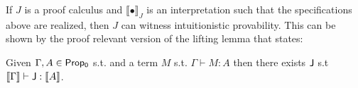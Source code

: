     If  $J$ is a proof calculus and $\llbracket\bullet \rrbracket_J$ is  an interpretation such that the specifications above  
    are realized, then $J$ can witness intuitionistic provability. This can be shown by the proof relevant version of the lifting  lemma
    that states:
    \begin{lemma}
        \label{bracklift}
        Given  $\Gamma,  A \in {\sf Prop_0}$ s.t. and a term $M$ s.t. $\Gamma\vdash  M: A $ then there exists ${\sf J}$ s.t  $\llbracket \Gamma\rrbracket \vdash {\sf J}:\llbracket   A \rrbracket$. 
    \end{lemma}
    
    
    
    
